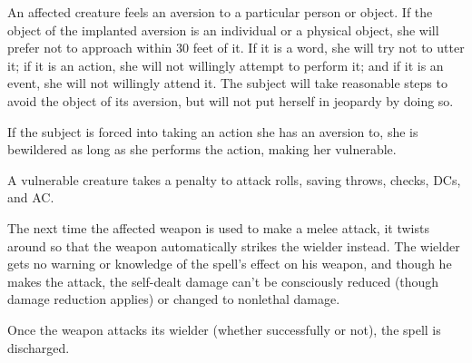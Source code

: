 \spellrng{\rngmed}
\spelldur{\durext}
\begin{spelleffect}
  An affected creature feels an aversion to a particular person or object. If the object of the implanted aversion is an individual or a physical object, she will prefer not to approach within 30 feet of it. If it is a word, she will try not to utter it; if it is an action, she will not willingly attempt to perform it; and if it is an event, she will not willingly attend it. The subject will take reasonable steps to avoid the object of its aversion, but will not put herself in jeopardy by doing so.
  \par If the subject is forced into taking an action she has an aversion to, she is bewildered as long as she performs the action, making her vulnerable.
\end{spelleffect}
\begin{spellnotes}
  A vulnerable creature takes a  penalty to attack rolls, saving throws, checks, DCs, and AC.
\end{spellnotes}

\begin{comment}
\subsubsection{B}
\end{comment}

\spellrng{\rngmed}
\begin{spelleffect}
  The next time the affected weapon is used to make a melee attack, it twists around so that the weapon automatically strikes the wielder instead. The wielder gets no warning or knowledge of the spell's effect on his weapon, and though he makes the attack, the self-dealt damage can't be consciously reduced (though damage reduction applies) or changed to nonlethal damage.
  \par Once the weapon attacks its wielder (whether successfully or not), the spell is discharged.
\end{spelleffect}


